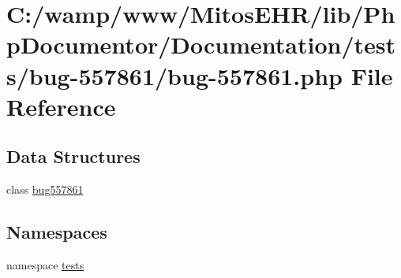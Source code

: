 \hypertarget{bug-557861_8php}{\section{\-C\-:/wamp/www/\-Mitos\-E\-H\-R/lib/\-Php\-Documentor/\-Documentation/tests/bug-\/557861/bug-\/557861.php \-File \-Reference}
\label{bug-557861_8php}
}
\subsection*{\-Data \-Structures}
\begin{DoxyCompactItemize}
\item 
class \hyperlink{classbug557861}{bug557861}
\end{DoxyCompactItemize}
\subsection*{\-Namespaces}
\begin{DoxyCompactItemize}
\item 
namespace \hyperlink{namespacetests}{tests}
\end{DoxyCompactItemize}
